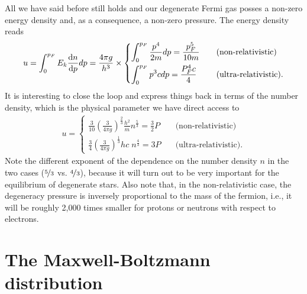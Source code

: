 All we have said before still holds and our degenerate Fermi gas posses a non-zero
energy density and, as a consequence, a non-zero pressure.
The energy density reads
\begin{align*}
  u = \int_0^{p_F} E_k \dv{n}{p} dp = \frac{4\pi g}{h^3} \times
  \begin{cases}
    \displaystyle\int_0^{p_F} \frac{p^4}{2m} dp = \frac{p_F^5}{10 m}
    & \quad\text{(non-relativistic)}\\[8pt]
    \displaystyle\int_0^{p_F} p^3 c dp = \frac{P_F^4 c}{4}
    & \quad\text{(ultra-relativistic)}.
  \end{cases}
\end{align*}
It is interesting to close the loop and express things back in terms of the number
density, which is the physical parameter we have direct access to
\begin{align}
  u =
  \begin{cases}
    \displaystyle %
    \frac{3}{10} \left(\frac{3}{4\pi g}\right)^\frac{2}{3} \frac{h^2}{m} n^\frac{5}{3}
    = \frac{3}{2} P
    & \quad\text{(non-relativistic)}\\[8pt]
    \displaystyle %
    \frac{3}{4} \left(\frac{3}{4\pi g}\right)^\frac{1}{3} hc\; n^\frac{4}{3}
    = 3 P
    & \quad\text{(ultra-relativistic)}.
  \end{cases}
\end{align}
Note the different exponent of the dependence on the number density $n$ in the
two cases ($\nicefrac{5}{3}$ vs. $\nicefrac{4}{3}$), because it will turn out to
be very important for the equilibrium of degenerate stars. Also note that, in the
non-relativistic case, the degeneracy pressure is inversely proportional to the
mass of the fermion, i.e., it will be roughly 2,000 times smaller for protons or
neutrons with respect to electrons.



\section{The Maxwell-Boltzmann distribution}
\label{sec:maxwel_boltzmann_dist}

